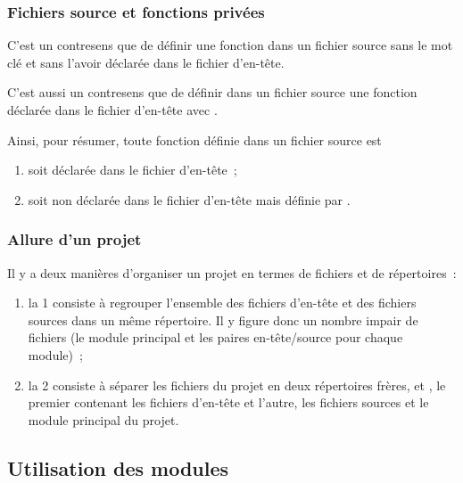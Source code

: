 \begin{frame}[fragile]
\frametitle{Fichiers source et fonctions privées}
C'est un contresens que de définir une fonction dans un fichier source
sans le mot clé  et sans l'avoir déclarée dans le fichier
d'en-tête.
\bigskip

C'est aussi un contresens que de définir dans un fichier source une
fonction déclarée dans le fichier d'en-tête avec .
\bigskip

Ainsi, pour résumer, toute fonction définie dans un fichier source est
\begin{enumerate}
    \item soit déclarée dans le fichier d'en-tête~;
    \item soit non déclarée dans le fichier d'en-tête mais définie
    par .
\end{enumerate}
\end{frame}

\begin{frame}[fragile]
\frametitle{Allure d'un projet}
Il y a deux manières d'organiser un projet en termes de fichiers et de
répertoires~:
\medskip

\begin{enumerate}
    \item la 1\iere{} consiste à regrouper l'ensemble des fichiers
    d'en-tête et des fichiers sources dans un même répertoire. Il y figure
    donc un nombre impair de fichiers (le module principal et les
    paires en-tête/source pour chaque module)~;
    \bigskip

    \item la 2\ieme{} consiste à séparer les fichiers du projet
    en deux répertoires frères,  et , le
    premier contenant les fichiers d'en-tête et l'autre, les fichiers
    sources et le module principal du projet.
\end{enumerate}

\end{frame}

\subsection{Utilisation des modules}

